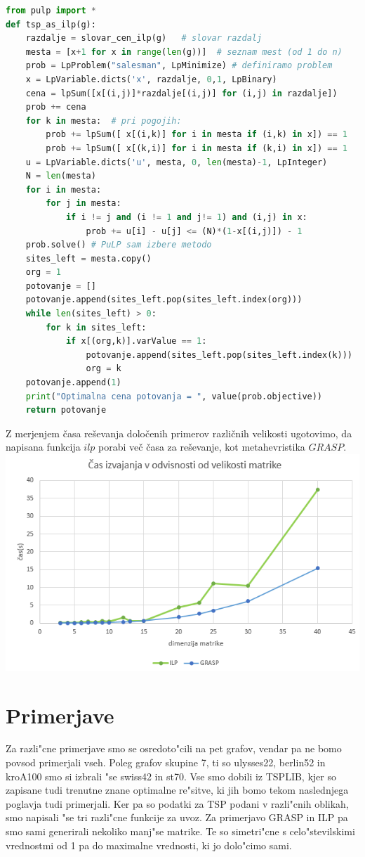 \documentclass[12pt,a4paper]{amsart}
\theoremstyle{definition} %
\theoremstyle{plain} %
\begin{document}
\begin{lstlisting}[language=Python]
from pulp import *
def tsp_as_ilp(g):
    razdalje = slovar_cen_ilp(g)   # slovar razdalj 
    mesta = [x+1 for x in range(len(g))]  # seznam mest (od 1 do n)
    prob = LpProblem("salesman", LpMinimize) # definiramo problem
    x = LpVariable.dicts('x', razdalje, 0,1, LpBinary) 
    cena = lpSum([x[(i,j)]*razdalje[(i,j)] for (i,j) in razdalje]) 
    prob += cena
    for k in mesta:  # pri pogojih:
        prob += lpSum([ x[(i,k)] for i in mesta if (i,k) in x]) == 1  
        prob += lpSum([ x[(k,i)] for i in mesta if (k,i) in x]) == 1  
    u = LpVariable.dicts('u', mesta, 0, len(mesta)-1, LpInteger) 
    N = len(mesta)
    for i in mesta:  
        for j in mesta:
            if i != j and (i != 1 and j!= 1) and (i,j) in x:
                prob += u[i] - u[j] <= (N)*(1-x[(i,j)]) - 1
    prob.solve() # PuLP sam izbere metodo
    sites_left = mesta.copy()
    org = 1 
    potovanje = []
    potovanje.append(sites_left.pop(sites_left.index(org))) 
    while len(sites_left) > 0:
        for k in sites_left:
            if x[(org,k)].varValue == 1:
                potovanje.append(sites_left.pop(sites_left.index(k)))
                org = k             
    potovanje.append(1)    
    print("Optimalna cena potovanja = ", value(prob.objective))
    return potovanje
\end{lstlisting}

Z merjenjem časa reševanja določenih primerov različnih velikosti ugotovimo, da napisana funkcija $ilp$ porabi več časa za reševanje, kot metahevristika $GRASP$. 
\includegraphics[scale =0.8]{casilp}


\section{Primerjave}
Za razli"cne primerjave smo se osredoto"cili na pet grafov, vendar pa ne bomo povsod primerjali vseh. Poleg grafov skupine 7, ti so ulysses22, berlin52 in kroA100 smo si izbrali "se swiss42 in st70. Vse smo dobili iz TSPLIB, kjer so zapisane tudi trenutne znane optimalne re"sitve, ki jih bomo tekom naslednjega poglavja tudi primerjali. Ker pa so podatki za TSP podani v razli"cnih oblikah, smo napisali "se tri razli"cne funkcije za uvoz. Za primerjavo GRASP in ILP pa smo sami generirali nekoliko manj"se matrike. Te so simetri"cne s celo"stevilskimi vrednostmi od 1 pa do maximalne vrednosti, ki jo dolo"cimo sami. 
\end{document}
